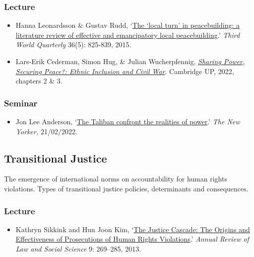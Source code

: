 \documentclass[12pt, a4paper]{article}
\begin{document}
\subsubsection*{Lecture}

\begin{itemize}
\setlength\itemsep{0pt}
\item Hanna Leonardsson \& Gustav Rudd, `\href{https://doi.org/10.1080/01436597.2015.1029905}{The ‘local turn’ in peacebuilding: a literature review of effective and emancipatory local peacebuilding}.' \textit{Third World Quarterly} 36(5): 825-839, 2015.
\item Lars-Erik Cederman, Simon Hug, \& Julian Wucherpfennig, \href{https://doi.org/10.1017/9781108284639}{\textit{Sharing Power, Securing Peace?: Ethnic Inclusion and Civil War}}. Cambridge UP, 2022, chapters 2 \& 3.
\end{itemize}

\subsubsection*{Seminar}

\begin{itemize}
\setlength\itemsep{0pt}
\item Jon Lee Anderson, `\href{https://www.newyorker.com/magazine/2022/02/28/the-taliban-confront-the-realities-of-power-afghanistan}{The Taliban confront the realities of power}.' \textit{The New Yorker,} 21/02/2022.
\end{itemize}


\hline %

\subsection{Transitional Justice}\label{tj}

The emergence of international norms on accountability for human rights violations. Types of transitional justice policies, determinants and consequences.

\subsubsection*{Lecture}

\begin{itemize}
\setlength\itemsep{0pt}
\item Kathryn Sikkink and Hun Joon Kim, `\href{https://doi.org/10.1146/annurev-lawsocsci-102612-133956}{The Justice Cascade: The Origins and Effectiveness of Prosecutions of Human Rights Violations}.' \textit{Annual Review of Law and Social Science} 9: 269--285, 2013.
\end{itemize}
\end{document}
